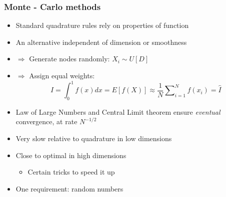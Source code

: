 \documentclass[bigger,handout]{beamer}
\newenvironment{stepitemize}{\begin{itemize}[<+->]}{\end{itemize} }
\begin{document}
\begin{frame}%

\frametitle{Monte - Carlo methods}

\begin{stepitemize}
\item Standard quadrature rules rely on properties of function
\item An alternative independent of dimension or smoothness 

\item $\Rightarrow $ Generate nodes randomly: $X_{i}\sim U[D]$

\item $\Rightarrow $ Assign equal weights:%
\begin{equation*}
I=\int_{0}^{1}f(x)dx=E[f(X)]\approx \frac{1}{N}\sum%
\nolimits_{i=1}^{N}f(x_{i})=\hat{I}
\end{equation*}

\item Law of Large Numbers and Central Limit theorem \newline
ensure \emph{eventual} convergence, at rate $N^{-1/2}$ 

\item Very slow relative to quadrature in low dimensions
\item Close to optimal in high dimensions

\begin{itemize}
\item Certain tricks to speed it up
\end{itemize}

\item One requirement: random numbers



\end{stepitemize}


\end{frame}%
\end{document}
